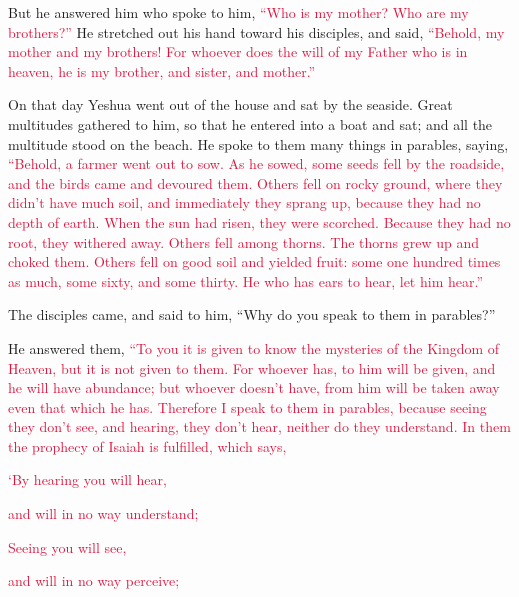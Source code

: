 \myverse{}But he answered him who spoke to him,
\textcolor{crimson}{“Who is my mother? Who are my brothers?”}
\myverse{}He stretched out his hand toward his disciples, and said,
\textcolor{crimson}{“Behold, my mother and my brothers!
}
\myverse{}\textcolor{crimson}{For whoever does the will of my Father who is in heaven, he is my brother,
	and sister, and mother.”}


\mychapter{} \myverse*{}On that day Yeshua went out of the house and sat by the seaside.
\myverse{}Great multitudes gathered to him, so that he entered into a boat and sat; and
all the multitude stood on the beach.
\myverse{}He spoke to them many things in parables, saying,
\textcolor{crimson}{“Behold, a farmer went out to sow.
}
\myverse{}\textcolor{crimson}{As he sowed, some seeds fell by the roadside, and the birds came and devoured
	them.
}
\myverse{}\textcolor{crimson}{Others fell on rocky ground, where they didn’t have much soil, and immediately
	they sprang up, because they had no depth of earth.
}
\myverse{}\textcolor{crimson}{When the sun had risen, they were scorched. Because they had no root, they
	withered away.
}
\myverse{}\textcolor{crimson}{Others fell among thorns. The thorns grew up and choked them.
}
\myverse{}\textcolor{crimson}{Others fell on good soil and yielded fruit: some one hundred times as much,
	some sixty, and some thirty.
}
\myverse{}\textcolor{crimson}{He who has ears to hear, let him hear.”}

\myverse{}The disciples came, and said to him, “Why do you speak to them
in parables?”

\myverse{}He answered them,
\textcolor{crimson}{“To you it is given to know the mysteries of the Kingdom of Heaven, but it is not given to them.
}
\myverse{}\textcolor{crimson}{For whoever has, to him will be given, and he will have abundance; but
	whoever doesn’t have, from him will be taken away even that which he has.
}
\myverse{}\textcolor{crimson}{Therefore I speak to them in parables, because seeing they don’t see,
	and hearing, they don’t hear, neither do they understand.
}
\myverse{}\textcolor{crimson}{In them the prophecy of Isaiah is fulfilled, which says,
}

\textcolor{crimson}{‘By hearing you will hear,}

\textcolor{crimson}{and will in no way understand;}

\textcolor{crimson}{Seeing you will see,}

\textcolor{crimson}{and will in no way perceive;}

